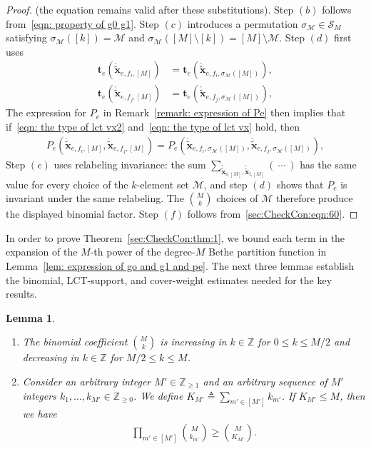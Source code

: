 \documentclass[journal]{IEEEtran}
\newcommand{\add}[1]{{\color{black}#1}}
\newtheorem{lemma}[theorem]{Lemma}
\newcommand{\vect}[1]{ \bm{#1} }
\newcommand{\set}[1]{\mathcal{#1}}
\newcommand{\sZ}{\mathbb{Z}}
\newcommand{\defeq}{ \triangleq }
\newcommand{\sZp}{ \mathbb{Z}_{\geq 0} }
\newcommand{\sZpp}{ \mathbb{Z}_{\geq 1} }
\newcommand{\LCTtv}[1]{ \mathring{ \tilde{ \vect{#1} } } }
\newcommand{\efi}{ e,f_i }
\newcommand{\efj}{ e,f_j }
\newcommand{\LCTvxlM}{ \LCTtv{x}_{\mathrm{l},[M]} }
\newcommand{\LCTvxsM}{ \LCTtv{x}_{\mathrm{s},[M]} }
\begin{document}
\begin{appendices}
\begin{proof}
    (the equation remains valid after these substitutions).
    Step $(b)$ follows from~\eqref{eqn: property of g0 g1}.
    Step $(c)$ introduces a permutation $ \sigma_{\set{M}} \in \set{S}_{M} $ satisfying
    $ \sigma_{\set{M}}( [k] ) = \set{M} $
    and
    $ \sigma_{\set{M}}( [M] \setminus [k] ) = [M] \setminus \set{M} $.
    Step $(d)$ first uses
    \begin{align}
      \bm{t}_{e}(\LCTtv{x}_{\efi,[M]}) & = \bm{t}_{e}(\LCTtv{x}_{\efi,\sigma_{\set{M}}([M])}), \label{eqn: the type of lct vx2} \\   \bm{t}_{e}(\LCTtv{x}_{\efj,[M]}) &= \bm{t}_{e}(\LCTtv{x}_{\efj,\sigma_{\set{M}}([M])}),
      \label{eqn: the type of lct vx}
    \end{align}
    The expression for $ P_{e} $ in Remark~\ref{remark: expression of Pe} then implies that
    if~\eqref{eqn: the type of lct vx2} and~\eqref{eqn: the type of lct vx} hold,
    then
    \begin{align*}
      P_{e}( \LCTtv{x}_{\efi,[M]},\LCTtv{x}_{\efj,[M]} )
      = P_{e}( \LCTtv{x}_{\efi,\sigma_{\set{M}}([M])}, \LCTtv{x}_{\efj,\sigma_{\set{M}}([M])} ),
    \end{align*}
    Step $(e)$ uses relabeling invariance: the sum
    $\sum_{ \LCTvxsM, \LCTvxlM } (\ \cdots\ )$ has the same value for every choice
    of the $k$-element set $\set{M}$, and step $(d)$ shows that $P_e$ is
    invariant under the same relabeling. The $\binom{M}{k}$ choices of
    $\set{M}$ therefore produce the displayed binomial factor.  Step $(f)$
    follows from~\eqref{sec:CheckCon:eqn:60}.
  \end{proof}

  \add{In order to prove Theorem~\ref{sec:CheckCon:thm:1}, we bound each term
    in the expansion of the $M$-th power of the degree-$M$ Bethe partition
    function in Lemma~\ref{lem: expression of go and g1 and pe}. The next
    three lemmas establish the binomial, LCT-support, and cover-weight
    estimates needed for the key results.}

  \begin{lemma}\label{sec:CheckCon:lem:2}
    \noindent
    \begin{enumerate}
      \item \add{The binomial coefficient $ \binom{M}{k} $ is increasing in
              $ k \in \sZ $ for $ 0 \leq k \leq M/2 $ and decreasing in
              $ k \in \sZ $ for $M/2 \leq k \leq M $.}

      \item Consider an arbitrary integer $ M' \in \sZpp $ and an arbitrary
            sequence of $M'$ integers $ k_{1},\ldots,k_{M'} \in \sZp $.  We define
            $K_{M'} \defeq \sum_{m' \in [M']} k_{m'}$. If $ K_{M'} \leq M $,
            \add{then we have}
            \begin{align}
              \prod\limits_{m' \in [M']}\binom{M}{ k_{m'} }
              \geq
              \binom{M}{K_{M'}}. \label{sec:CheckCon:eqn:82}
            \end{align}
    \end{enumerate}


\end{lemma}
\end{appendices}
\end{document}
